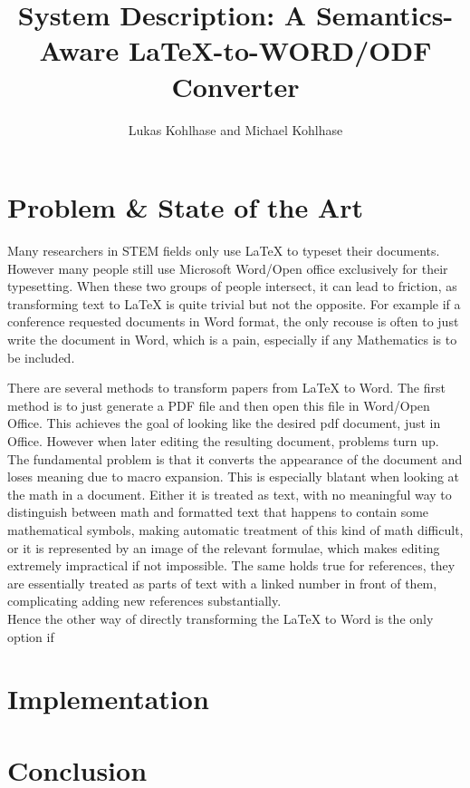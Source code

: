 \documentclass[draft]{llncs}
\title{System Description: A Semantics-Aware {\LaTeX}-to-WORD/ODF Converter}
\author{Lukas Kohlhase and Michael Kohlhase}
\institute{
  Math/CS, Jacobs University Bremen}
\begin{document}
\maketitle
\begin{abstract}
\end{abstract}

\section{Problem \& State of the Art}\label{sec:intro}

Many researchers in STEM fields only use {\LaTeX} to typeset their documents. However many
people still use Microsoft Word/Open office exclusively for their typesetting. When these
two groups of people intersect, it can lead to friction, as transforming text to {\LaTeX}
is quite trivial but not the opposite. For example if a conference requested documents in
Word format, the only recouse is often to just write the document in Word, which is a
pain, especially if any Mathematics is to be included.


There are several methods to transform papers from {\LaTeX} to Word. The first method is
to just generate a PDF file and then open this file in Word/Open Office. This achieves the goal of looking like the desired pdf document, just in Office. However when later editing the resulting document, problems turn up. 
The fundamental problem is that it converts the appearance of the document and loses meaning due to macro expansion. This is especially blatant when looking at the math in a document. Either it is treated as text, with no meaningful way to distinguish between math and formatted text that happens to contain some mathematical symbols, making automatic treatment of this kind of math difficult, or it is represented by an image of the relevant formulae, which makes editing extremely impractical if not impossible. The same holds true for references, they are essentially treated as parts of text with a linked number in front of them, complicating adding new references substantially. \\ 
Hence the other way of directly transforming the {\LaTeX} to Word is the only option if 

\section{Implementation}\label{sec:impl}

\section{Conclusion}\label{sec:concl}
\printbibliography
\end{document}

